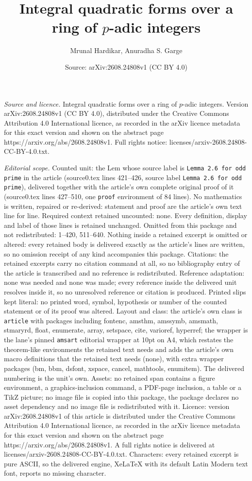 \documentclass[10pt,a4paper]{amsart}
\title[Integral quadratic forms over a ring of $p$-adic integers]{Integral quadratic forms over a ring of $p$-adic integers}
\author{Mrunal Hardikar, Anuradha S. Garge}
\date{Source: arXiv:2608.24808v1 (CC BY 4.0)}
\begin{document}
\maketitle

\noindent\emph{Source and licence.} Integral quadratic forms over a ring of $p$-adic integers. Version arXiv:2608.24808v1 (CC BY 4.0), distributed under the Creative Commons Attribution 4.0 International licence, as recorded in the arXiv licence metadata for this exact version and shown on the abstract page https://arxiv.org/abs/2608.24808v1. Full rights notice: licenses/arxiv-2608.24808-CC-BY-4.0.txt.\par\smallskip

\noindent\textit{Editorial scope.} Counted unit: the Lem whose source label is \texttt{Lemma 2.6 for odd prime} in the article (source0.tex lines 421--426, source label \texttt{Lemma 2.6 for odd prime}), delivered together with the article's own complete original proof of it (source0.tex lines 427--510, one \texttt{proof} environment of 84 lines). No mathematics is written, repaired or re-derived: statement and proof are the article's own text line for line. Required context retained uncounted: none. Every definition, display and label of those lines is retained unchanged. Omitted from this package and not redistributed: 1--420, 511--640. Nothing inside a retained excerpt is omitted or altered: every retained body is delivered exactly as the article's lines are written, so no omission receipt of any kind accompanies this package. Citations: the retained excerpts carry no citation command at all, so no bibliography entry of the article is transcribed and no reference is redistributed. Reference adaptation: none was needed and none was made; every reference inside the delivered unit resolves inside it, so no unresolved reference or citation is produced. Printed slips kept literal: no printed word, symbol, hypothesis or number of the counted statement or of its proof was altered. Layout and class: the article's own class is \texttt{article} with packages including fontenc, amsthm, amssymb, amsmath, stmaryrd, float, enumerate, array, setspace, cite, varioref, hyperref; the wrapper is the lane's pinned \texttt{amsart} editorial wrapper at 10pt on A4, which restates the theorem-like environments the retained text needs and adds the article's own macro definitions that the retained text needs (none), with extra wrapper packages (bm, bbm, dsfont, xspace, cancel, mathtools, enumitem). The delivered numbering is the unit's own. Assets: no retained span contains a figure environment, a graphics-inclusion command, a PDF-page inclusion, a table or a TikZ picture; no image file is copied into this package, the package declares no asset dependency and no image file is redistributed with it. Licence: version arXiv:2608.24808v1 of this article is distributed under the Creative Commons Attribution 4.0 International licence, as recorded in the arXiv licence metadata for this exact version and shown on the abstract page https://arxiv.org/abs/2608.24808v1. A full rights notice is delivered at licenses/arxiv-2608.24808-CC-BY-4.0.txt. Characters: every retained excerpt is pure ASCII, so the delivered engine, XeLaTeX with its default Latin Modern text font, reports no missing character.
\end{document}
